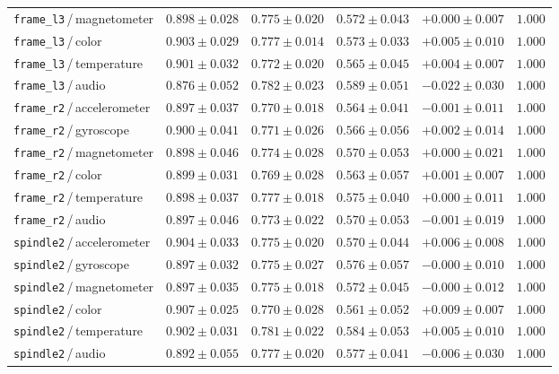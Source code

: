 \begin{table}[ht]
\begin{tabular}{l c c c c c}
\texttt{frame\_l3}\,/\,magnetometer & $0.898 \pm 0.028$ & $0.775 \pm 0.020$ & $0.572 \pm 0.043$ & $+0.000 \pm 0.007$ & $1.000$ \\
\texttt{frame\_l3}\,/\,color & $0.903 \pm 0.029$ & $0.777 \pm 0.014$ & $0.573 \pm 0.033$ & $+0.005 \pm 0.010$ & $1.000$ \\
\texttt{frame\_l3}\,/\,temperature & $0.901 \pm 0.032$ & $0.772 \pm 0.020$ & $0.565 \pm 0.045$ & $+0.004 \pm 0.007$ & $1.000$ \\
\texttt{frame\_l3}\,/\,audio & $0.876 \pm 0.052$ & $0.782 \pm 0.023$ & $0.589 \pm 0.051$ & $-0.022 \pm 0.030$ & $1.000$ \\
\texttt{frame\_r2}\,/\,accelerometer & $0.897 \pm 0.037$ & $0.770 \pm 0.018$ & $0.564 \pm 0.041$ & $-0.001 \pm 0.011$ & $1.000$ \\
\texttt{frame\_r2}\,/\,gyroscope & $0.900 \pm 0.041$ & $0.771 \pm 0.026$ & $0.566 \pm 0.056$ & $+0.002 \pm 0.014$ & $1.000$ \\
\texttt{frame\_r2}\,/\,magnetometer & $0.898 \pm 0.046$ & $0.774 \pm 0.028$ & $0.570 \pm 0.053$ & $+0.000 \pm 0.021$ & $1.000$ \\
\texttt{frame\_r2}\,/\,color & $0.899 \pm 0.031$ & $0.769 \pm 0.028$ & $0.563 \pm 0.057$ & $+0.001 \pm 0.007$ & $1.000$ \\
\texttt{frame\_r2}\,/\,temperature & $0.898 \pm 0.037$ & $0.777 \pm 0.018$ & $0.575 \pm 0.040$ & $+0.000 \pm 0.011$ & $1.000$ \\
\texttt{frame\_r2}\,/\,audio & $0.897 \pm 0.046$ & $0.773 \pm 0.022$ & $0.570 \pm 0.053$ & $-0.001 \pm 0.019$ & $1.000$ \\
\texttt{spindle2}\,/\,accelerometer & $0.904 \pm 0.033$ & $0.775 \pm 0.020$ & $0.570 \pm 0.044$ & $+0.006 \pm 0.008$ & $1.000$ \\
\texttt{spindle2}\,/\,gyroscope & $0.897 \pm 0.032$ & $0.775 \pm 0.027$ & $0.576 \pm 0.057$ & $-0.000 \pm 0.010$ & $1.000$ \\
\texttt{spindle2}\,/\,magnetometer & $0.897 \pm 0.035$ & $0.775 \pm 0.018$ & $0.572 \pm 0.045$ & $-0.000 \pm 0.012$ & $1.000$ \\
\texttt{spindle2}\,/\,color & $0.907 \pm 0.025$ & $0.770 \pm 0.028$ & $0.561 \pm 0.052$ & $+0.009 \pm 0.007$ & $1.000$ \\
\texttt{spindle2}\,/\,temperature & $0.902 \pm 0.031$ & $0.781 \pm 0.022$ & $0.584 \pm 0.053$ & $+0.005 \pm 0.010$ & $1.000$ \\
\texttt{spindle2}\,/\,audio & $0.892 \pm 0.055$ & $0.777 \pm 0.020$ & $0.577 \pm 0.041$ & $-0.006 \pm 0.030$ & $1.000$ \\

\end{tabular}
\end{table}
